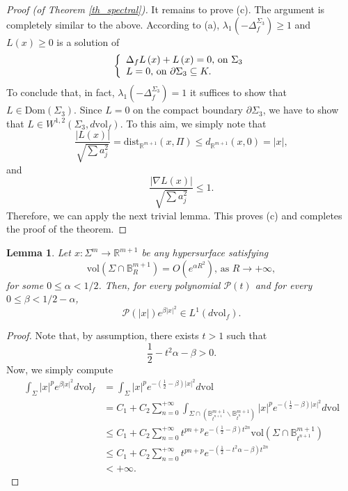 \documentclass[11pt,leqno]{amsart}\usepackage{amsmath}
\newtheorem{lemma}[theorem]{Lemma}
\numberwithin{equation}{section}
\begin{document}
\begin{proof}[Proof (of Theorem \ref{th_spectral})]
It remains to prove (c). The argument is completely similar to the above.
According to (a), $\lambda_{1}(-\Delta_{f}^{\Sigma_{3}})\geq1$ and $L\left(
x\right)  \geq0$ is a solution of\[
\left\{
\begin{array}
[c]{l}\Delta_{f}L\left(  x\right)  +L\left(  x\right)  =0\text{, on }\Sigma_{3}\\
L=0\text{, on }\partial\Sigma_{3}\subseteq K.
\end{array}
\right.
\]
To conclude that, in fact, $\lambda_{1}(-\Delta_{f}^{\Sigma_{3}})=1$ it
suffices to show that $L \in \mathrm{Dom}(\Sigma_3)$. Since  $L=0$ on the compact boundary  $\partial \Sigma_3$, we have to show that $L \in W^{1,2}\left(\Sigma_3, d\mathrm{vol}_{f}\right)  $. To this aim, we simply note that
\[
\frac{\left\vert L\left(  x\right)  \right\vert }{\sqrt{\sum a_{j}^{2}}}=\mathrm{dist}_{\mathbb{R}^{m+1}}\left(  x,\Pi\right)  \leq d_{\mathbb{R}^{m+1}}\left(  x,0\right)  = |x|,
\]
and
\[
\frac{|\nabla L\left(  x\right)| }{\sqrt{\sum a_{j}^{2}}}
\leq 1.
\]
Therefore, we can apply the next trivial lemma. This proves (c) and completes the proof of the theorem.
\end{proof}


\begin{lemma}\label{VolGrowths}
Let $x\colon \Sigma^{m}\rightarrow\mathbb{R}^{m+1}$ be any hypersurface satisfying\[
\mathrm{vol}\left(  \Sigma\cap\mathbb{B}^{m+1}_{R}\right)  =O\left(  e^{\alpha
R^2}\right)  \text{, as }R\rightarrow+\infty,
\]
for some $0\leq\alpha<1/2$. Then, for every polynomial $\mathcal{P}\left(
t\right)  $ and for every $0\leq\beta<1/2-\alpha$,\[
\mathcal{P}\left(  \left\vert x\right\vert \right)  e^{\beta\left\vert
x\right\vert ^{2}}\in L^{1}\left(  d\mathrm{vol}_{f}\right)  .
\]

\end{lemma}

\begin{proof}
Note that, by assumption, there exists $t>1$ such that\[
\frac{1}{2}-t^2 \alpha-\beta>0.
\]
Now, we simply compute\begin{align*}
\int_{\Sigma}\left\vert x\right\vert ^{p}e^{\beta\left\vert x\right\vert ^{2}}d\mathrm{vol}_{f} &  =\int_{\Sigma}\left\vert x\right\vert ^{p}e^{-\left(
\frac{1}{2}-\beta\right)  \left\vert x\right\vert ^{2}}d\mathrm{vol}\\
&  =C_{1}+C_{2}\sum_{n=0}^{+\infty}\int_{\Sigma\cap\left(  \mathbb{B}_{t^{n+1}}^{m+1}\backslash\mathbb{B}_{t^{n}}^{m+1}\right)  }\left\vert
x\right\vert ^{p}e^{-\left(  \frac{1}{2}-\beta\right)  \left\vert x\right\vert
^{2}}d\mathrm{vol}\\
&  \leq C_{1}+C_{2}\sum_{n=0}^{+\infty}t^{pn+p}e^{-\left(  \frac{1}{2}-\beta\right)  t^{2n}}\mathrm{vol}\left(  \Sigma\cap\mathbb{B}_{t^{n+1}}^{m+1}\right)  \\
&  \leq C_{1}+C_{2}\sum_{n=0}^{+\infty}t^{pn+p}e^{-\left(  \frac{1}{2}-t^{2}\alpha-\beta\right)  t^{2n}}\\
&  <+\infty.
\end{align*}

\end{proof}
\end{document}
